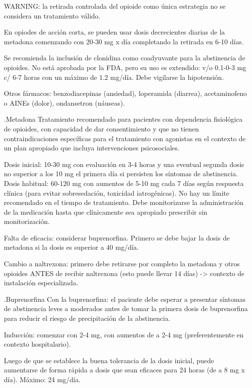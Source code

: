 WARNING: la retirada controlada del opioide como única estrategia no se considera un tratamiento válido.

En opiodes de acción corta, se pueden usar dosis decrecientes diarias de la metadona comenzando con 20-30 mg x día completando la retirada en 6-10 días.

Se recomienda la inclusión de clonidina como coadyuvante para la abstinencia de opioides. No está aprobada por la FDA, pero su uso es extendido: v/o 0.1-0-3 mg c/ 6-7 horas con un máximo de 1.2 mg/día. Debe vigilarse la hipotensión.

Otros fármacos: benzodiacepinas (ansiedad), loperamida (diarrea), acetaminofeno o AINEs (dolor), ondansetron (náuseas).

.Metadona
Tratamiento recomendado para pacientes con dependencia fisiológica de opioides, con capacidad de dar consentimiento y que no tienen contraindicaciones específicas para el tratamiento con agonistas en el contexto de un plan apropiado que incluya intervenciones psicosociales.

Dosis inicial: 10-30 mg con evaluación en 3-4 horas y una eventual segunda dosis no superior a los 10 mg el primera día si persisten los síntomas de abstinencia.
Dosis habitual: 60-120 mg con aumentos de 5-10 mg cada 7 días según respuesta clínica (para evitar sobresedación, toxicidad iatrogénicas). No hay un límite recomendado en el tiempo de tratamiento.
Debe monitorizarse la administración de la medicación hasta que clínicamente sea apropiado prescribir sin monitorización.

Falta de eficacia: considerar buprenorfina. Primero se debe bajar la dosis de metadona si la dosis es superior a 40 mg/día.

Cambio a naltrexona: primero debe retirarse por completo la metadona y otros opioides ANTES de recibir naltrexona (esto puede llevar 14 días) -> contexto de instalación especializada.


.Buprenorfina
Con la buprenorfina: el paciente debe esperar a presentar síntomas de abstinencia leves a moderados antes de tomar la primera dosis de buprenorfina para reducir el riesgo de precipitación de la abstinencia.

Inducción: comenzar con 2-4 mg, con aumentos de a 2-4 mg (preferentemente en contexto hospitalario).

Luego de que se establece la buena tolerancia de la dosis inicial, puede aumentarse de forma rápida a dosis que sean eficaces para 24 horas (de a 8 mg x día). Máximo: 24 mg/día.

